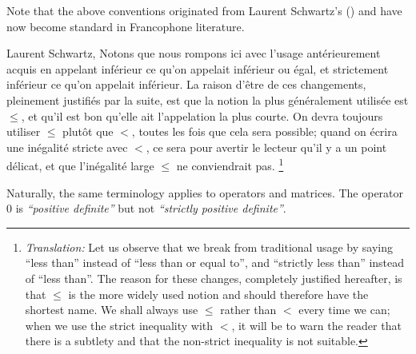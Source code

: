 Note that the above conventions originated from Laurent Schwartz's  (\cite{Schwartz1981})
and have now become standard in Francophone literature.

\begin{aquote}{Laurent Schwartz, \cite[p.~17]{Schwartz1981}}
    Notons que nous rompons ici avec l'usage ant\'erieurement acquis
    en appelant inf\'erieur ce qu'on appelait inf\'erieur ou \'egal,
    et strictement inf\'erieur ce qu'on appelait inf\'erieur.
    La raison d'\^etre de ces changements,
    pleinement justifi\'es par la suite,
    est que la notion la plus g\'en\'eralement utilis\'ee est $\leq$,
    et qu'il est bon qu'elle ait l'appelation la plus courte.
    On devra toujours utiliser $\leq$ plut\^ot que $<$,
    toutes les fois que cela sera possible;
    quand on \'ecrira une in\'egalit\'e stricte avec $<$,
    ce sera pour avertir le lecteur qu'il y a un point d\'elicat,
    et que l'in\'egalit\'e large $\leq$ ne conviendrait pas.
    \footnote{%
        \emph{Translation:}
        Let us observe that we break from traditional usage
        by saying ``less than'' instead of ``less than or equal to'',
        and ``strictly less than'' instead of ``less than''.
        The reason for these changes,
        completely justified hereafter,
        is that $\leq$ is the more widely used notion
        and should therefore have the shortest name.
        We shall always use $\leq$ rather than $<$
        every time we can;
        when we use the strict inequality with $<$,
        it will be to warn the reader that there is a subtlety
        and that the non-strict inequality is not suitable.
    }
\end{aquote}

Naturally, the same terminology applies to operators and matrices.
The operator $0$ is \emph{``positive definite''} but not \emph{``strictly positive definite''}.
